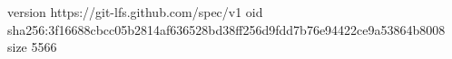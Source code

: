 version https://git-lfs.github.com/spec/v1
oid sha256:3f16688cbcc05b2814af636528bd38ff256d9fdd7b76e94422ce9a53864b8008
size 5566
